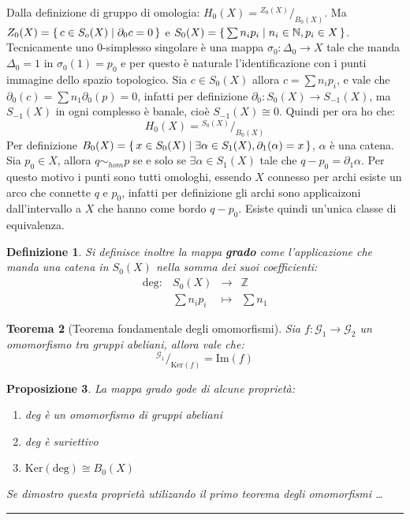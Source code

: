 \documentclass[10pt, twoside=false, x11names]{scrbook}
\newtheorem{theorem}{Teorema}[section]
\newtheorem{proposition}[theorem]{Proposizione}
\newtheorem{definition}[theorem]{Definizione}
\newenvironment{proof}{{\textbf{Dimostrazione}:}}{\hfill\rule{2mm}{2mm} \newline}
\newcommand{\Z}{\mathbb{Z}}
\newcommand{\im}[1]{\mathrm{Im}( #1 )}
\renewcommand{\ker}[1]{\mathrm{Ker}( #1)}
\newcommand*\quot[2]{{^{\textstyle #1}\big/_{\textstyle #2}}}
\begin{document}
\begin{proof}
  Dalla definizione di gruppo di omologia: $ H_0(X) = \quot{Z_0(X)}{B_0(X)} $.
  Ma $ Z_0(X) = \set{ c \in S_o(X) | \partial_0 c = 0} $ e $ S_0(X) = \set{ \sum n_i p_i | n_i \in \mathbb{N}, p_i \in X} $.
  Tecnicamente uno $ 0 $-simplesso singolare è una mappa $ \sigma_0 : \Delta_0 \to X $ tale che manda $ \Delta_0 = 1 $ in $ \sigma_0(1) = p_0 $ e per
  questo è naturale l'identificazione con i punti immagine dello spazio topologico.
  Sia $ c \in S_0(X) $ allora $ c = \sum n_i p_i $, e vale che $ \partial_0(c) = \sum n_1 \partial_0 (p) = 0 $, infatti per definizione
  $ \partial_0 : S_0(X) \to S_{-1}(X) $, ma $ S_{-1}(X) $ in ogni complesso è banale, cioè $ S_{-1}(X) \cong 0 $.
  Quindi per ora ho che:
  \[
    H_0(X) = \quot{S_0(X)}{B_0(X)}
  \]
  Per definizione $ B_0(X) = \set{ x \in S_0(X) | \exists \alpha \in S_1(X), \partial_1(\alpha) = x} $, $ \alpha $ è una catena. Sia $ p_0 \in X $, allora
  $ q \sim_{hom} p $ se e solo se $ \exists \alpha \in S_1(X) $ tale che $ q - p_0 = \partial_1 \alpha $. Per questo motivo i punti sono tutti omologhi,
  essendo $ X $ connesso per archi esiste un arco che connette $ q $ e $ p_0 $, infatti per definizione gli archi sono applicaizoni
  dall'intervallo a $ X $ che hanno come bordo $ q - p_0 $. Esiste quindi un'unica classe di equivalenza.

  \begin{definition}
    Si definisce inoltre la mappa \textbf{grado}  come l'applicazione che manda una catena in $ S_0(X) $ nella somma
    dei suoi coefficienti:
    \begin{align*}
      \mathrm{deg}: & S_0(X)    & \to & \Z \\
                    & \sum n_i p_i & \mapsto & \sum n_1
    \end{align*}
  \end{definition}

  \begin{theorem}[Teorema fondamentale degli omomorfismi]
    Sia $ f: \mathcal{G}_1 \to \mathcal{G}_2 $ un omomorfismo tra gruppi abeliani, allora vale che:
    \[
      \quot{\mathcal{G}_1}{\ker{f}} = \im{f}
    \]
  \end{theorem}

  \begin{proposition}
    La mappa grado gode di alcune proprietà:
    \begin{enumerate}
    \item deg è un omomorfismo di gruppi abeliani
    \item deg è suriettivo
    \item $ \ker{\mathrm{deg}} \cong B_0(X) $
    \end{enumerate}
    Se dimostro questa proprietà utilizando il primo teorema degli omomorfismi \dots


\end{proposition}
\end{proof}
\end{document}
